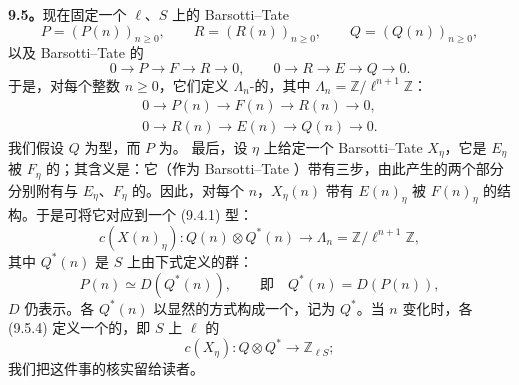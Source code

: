 \textbf{9.5。}现在固定一个 $\ell$、$S$ 上的 Barsotti--Tate 
\begin{equation}\tag{9.5.1}
 P=(P(n))_{n\geq0},\qquad R=(R(n))_{n\geq0},\qquad Q=(Q(n))_{n\geq0},
\end{equation}
以及 Barsotti--Tate 的
\begin{equation}\tag{9.5.2}
 0\longrightarrow P\longrightarrow F\longrightarrow R\longrightarrow0,
 \qquad0\longrightarrow R\longrightarrow E\longrightarrow Q\longrightarrow0.
\end{equation}
于是，对每个整数 $n\geq0$，它们定义 $\Lambda_n$-的，其中 $\Lambda_n=\mathbb Z/\ell^{n+1}\mathbb Z$：
\begin{equation}\tag{9.5.3}
 \begin{gathered}
 0\longrightarrow P(n)\longrightarrow F(n)\longrightarrow R(n)\longrightarrow0,\\
 0\longrightarrow R(n)\longrightarrow E(n)\longrightarrow Q(n)\longrightarrow0.
 \end{gathered}
\end{equation}
我们假设 $Q$ 为型，而 $P$ 为。
最后，设 $\eta$ 上给定一个 Barsotti--Tate  $X_\eta$，它是 $E_\eta$ 被 $F_\eta$ 的；其含义是：它（作为 Barsotti--Tate ）带有三步，由此产生的两个部分分别附有与 $E_\eta$、$F_\eta$ 的。因此，对每个 $n$，$X_\eta(n)$ 带有 $E(n)_\eta$ 被 $F(n)_\eta$ 的结构。于是可将它对应到一个 (9.4.1) 型：
\begin{equation}\tag{9.5.4}
 c(X(n)_\eta):Q(n)\otimes Q^*(n)\longrightarrow\Lambda_n
 =\mathbb Z/\ell^{n+1}\mathbb Z,
\end{equation}
其中 $Q^*(n)$ 是 $S$ 上由下式定义的群：
\[
 P(n)\simeq D(Q^*(n)),\qquad\text{即}\quad Q^*(n)=D(P(n)),
\]
$D$ 仍表示。各 $Q^*(n)$ 以显然的方式构成一个，记为 $Q^*$。当 $n$ 变化时，各 (9.5.4) 定义一个的，即 $S$ 上 $\ell$ 的
\begin{equation}\tag{9.5.5}
 c(X_\eta):Q\otimes Q^*\longrightarrow\mathbb Z_{\ell S};
\end{equation}
我们把这件事的核实留给读者。

